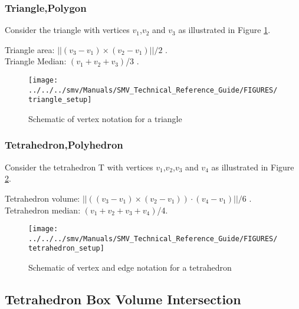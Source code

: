 \documentclass[12pt]{article}
\begin{document}
\subsubsection{Triangle,Polygon}
Consider the triangle with vertices $v_1$,$v_2$ and $v_3$ as illustrated in Figure \ref{figure:triangle_setup}.

\noindent Triangle area: $||(v_3-v_1)\times (v_2-v_1)||/2$ . \\
Triangle Median: $(v_1+v_2+v_3)$/3 .

\begin{figure}
\begin{center}
\texttt{[image: ../../../smv/Manuals/SMV\_Technical\_Reference\_Guide/FIGURES/triangle\_setup]}
\end{center}
\caption{Schematic of vertex notation for a triangle}
\label{figure:triangle_setup}
\end{figure}

\subsubsection{Tetrahedron,Polyhedron}
Consider the tetrahedron T with vertices $v_1$,$v_2$,$v_3$ and $v_4$ as illustrated in Figure \ref{figure:tetrahedron_setup}.

\noindent Tetrahedron volume: $||((v_3-v_1)\times (v_2-v_1))\cdot (v_4-v_1)||/6$ .\\
Tetrahedron median: $(v_1+v_2+v_3+v_4)$/4.

\begin{figure}
\begin{center}
\texttt{[image: ../../../smv/Manuals/SMV\_Technical\_Reference\_Guide/FIGURES/tetrahedron\_setup]}
\end{center}
\caption{Schematic of vertex and edge notation for a tetrahedron}
\label{figure:tetrahedron_setup}
\end{figure}


\newcommand{\tetra}{\mbox{tetra\_bounds}}
\newcommand{\bbox}{\mbox{box\_bounds}}
\newcommand{\txtmin}{\mbox{min}}
\newcommand{\txtmax}{\mbox{max}}
\subsection{Tetrahedron Box Volume Intersection}
\end{document}
